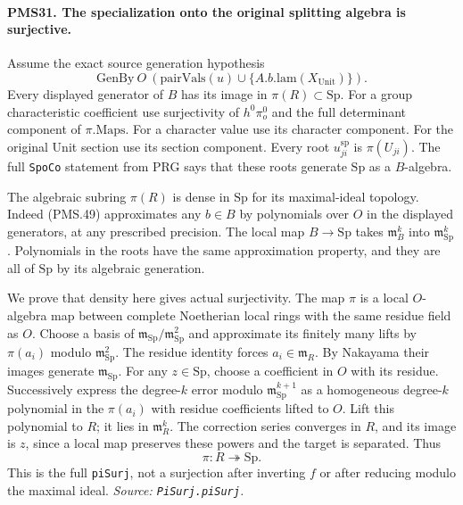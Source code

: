 \paragraph{PMS31. The specialization onto the original splitting algebra is surjective.}
\label{claim:PMS31}
Assume the exact source generation hypothesis
\[
 \mathrm{GenBy}\ O\
 \left(\mathrm{pairVals}(u)\cup
       \{A.b.\mathrm{lam}(X_{\mathrm{Unit}})\}\right).
                                                        \tag{PMS.49}
\]
Every displayed generator of $B$ has its image in
$\pi(R)\subset\mathrm{Sp}$.
For a group characteristic coefficient use surjectivity of
$h^0\pi_o^0$ and the full determinant component of
$\pi.\mathrm{Maps}$.
For a character value use its character component.
For the original Unit section use its section component.
Every root $u^\mathrm{sp}_{ji}$ is $\pi(U_{ji})$.
The full \texttt{SpoCo} statement from PRG says that these
roots generate $\mathrm{Sp}$ as a $B$-algebra.

The algebraic subring $\pi(R)$ is dense in $\mathrm{Sp}$ for
its maximal-ideal topology.
Indeed (PMS.49) approximates any $b\in B$ by polynomials over
$O$ in the displayed generators, at any prescribed precision.
The local map $B\to\mathrm{Sp}$ takes
$\mathfrak m_B^k$ into $\mathfrak m_{\mathrm{Sp}}^k$.
Polynomials in the roots have the same approximation property,
and they are all of $\mathrm{Sp}$ by its algebraic generation.

We prove that density here gives actual surjectivity.
The map $\pi$ is a local $O$-algebra map between complete
Noetherian local rings with the same residue field as $O$.
Choose a basis of
$\mathfrak m_{\mathrm{Sp}}/\mathfrak m_{\mathrm{Sp}}^2$
and approximate its finitely many lifts by $\pi(a_i)$ modulo
$\mathfrak m_{\mathrm{Sp}}^2$.
The residue identity forces $a_i\in\mathfrak m_R$.
By Nakayama their images generate
$\mathfrak m_{\mathrm{Sp}}$.
For any $z\in\mathrm{Sp}$, choose a coefficient in $O$ with
its residue.  Successively express the degree-$k$ error
modulo $\mathfrak m_{\mathrm{Sp}}^{k+1}$ as a homogeneous
degree-$k$ polynomial in the $\pi(a_i)$ with residue
coefficients lifted to $O$.
Lift this polynomial to $R$; it lies in $\mathfrak m_R^k$.
The correction series converges in $R$, and its image is
$z$, since a local map preserves these powers and the target
is separated.  Thus
\[
                         \pi:R\twoheadrightarrow\mathrm{Sp}. \tag{PMS.50}
\]
This is the full \texttt{piSurj}, not a surjection after
inverting $f$ or after reducing modulo the maximal ideal.
\hfill\textit{Source: \texttt{PiSurj.piSurj}.}

